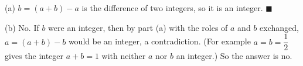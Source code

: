 (a) $b=(a+b)-a$ is the difference of two integers, so it is an integer. $\blacksquare$

(b) No. If $b$ were an integer, then by part (a) with the roles of $a$ and $b$ exchanged, $a=(a+b)-b$ would be an integer, a contradiction. (For example $a=b=\dfrac{1}{2}$ gives the integer $a+b=1$ with neither $a$ nor $b$ an integer.) So the answer is $\boxed{\text{no}}$.
